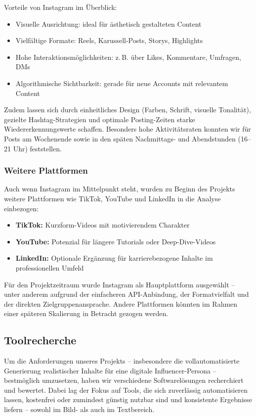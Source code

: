 \documentclass[a4paper,12pt]{article}
\begin{document}
Vorteile von Instagram im Überblick:

\begin{itemize}
    \item Visuelle Ausrichtung: ideal für ästhetisch gestalteten Content
    \item Vielfältige Formate: Reels, Karussell-Posts, Storys, Highlights
    \item Hohe Interaktionsmöglichkeiten: z.\,B. über Likes, Kommentare, Umfragen, DMs
    \item Algorithmische Sichtbarkeit: gerade für neue Accounts mit relevantem Content
\end{itemize}

Zudem lassen sich durch einheitliches Design (Farben, Schrift, visuelle Tonalität), gezielte Hashtag-Strategien und optimale Posting-Zeiten starke Wiedererkennungswerte schaffen. Besonders hohe Aktivitätsraten konnten wir für Posts am Wochenende sowie in den späten Nachmittags- und Abendstunden (16–21 Uhr) feststellen.

\subsubsection*{Weitere Plattformen}

Auch wenn Instagram im Mittelpunkt steht, wurden zu Beginn des Projekts weitere Plattformen wie TikTok, YouTube und LinkedIn in die Analyse einbezogen:

\begin{itemize}
    \item \textbf{TikTok:} Kurzform-Videos mit motivierendem Charakter
    \item \textbf{YouTube:} Potenzial für längere Tutorials oder Deep-Dive-Videos
    \item \textbf{LinkedIn:} Optionale Ergänzung für karrierebezogene Inhalte im professionellen Umfeld
\end{itemize}

Für den Projektzeitraum wurde Instagram als Hauptplattform ausgewählt – unter anderem aufgrund der einfacheren API-Anbindung, der Formatvielfalt und der direkten Zielgruppenansprache. Andere Plattformen könnten im Rahmen einer späteren Skalierung in Betracht gezogen werden.


\subsection{Toolrecherche}

Um die Anforderungen unseres Projekts – insbesondere die vollautomatisierte Generierung realistischer Inhalte für eine digitale Influencer-Persona – bestmöglich umzusetzen, haben wir verschiedene Softwarelösungen recherchiert und bewertet. Dabei lag der Fokus auf Tools, die sich zuverlässig automatisieren lassen, kostenfrei oder zumindest günstig nutzbar sind und konsistente Ergebnisse liefern – sowohl im Bild- als auch im Textbereich.
\end{document}
